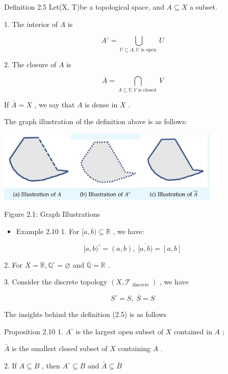 Definition 2.5 Let(X, T)be a topological space, and \(A \subseteq  X\) a subset.

1. The interior of \(A\) is

\[
{A}^{ \circ  } = \mathop{\bigcup }\limits_{{U \subseteq  A,U\text{ is open }}}U
\]

2. The closure of \(A\) is

\[
\bar{A} = \mathop{\bigcap }\limits_{{A \subseteq  V,V\text{ is closed }}}V
\]

If \(\bar{A} = X\) , we say that \(A\) is dense in \(X\) .

The graph illustration of the definition above is as follows:

\begin{center}
\includegraphics[max width=0.8\textwidth]{images/bo_d2bcsrref24c73avs720_25_282_922_1004_323_0.jpg}
\end{center}
\hspace*{3em} 

Figure 2.1: Graph Illustrations

\begin{itemize}
\item Example 2.10 1. For \(\lbrack a,b) \subseteq  \mathbb{R}\) , we have:
\end{itemize}

\[
\lbrack a,b{)}^{ \circ  } = \left( {a,b}\right) ,\;\overline{\lbrack a,b)} = \left\lbrack  {a,b}\right\rbrack
\]

2. For \(X = \mathbb{R},{\mathbb{Q}}^{ \circ  } = \varnothing\) and \(\overline{\mathbb{Q}} = \mathbb{R}\) .

3. Consider the discrete topology \(\left( {X,{\mathcal{T}}_{\text{ discrete }}}\right)\) , we have

\[
{S}^{ \circ  } = S,\;\bar{S} = S
\]

The insights behind the definition (2.5) is as follows

Proposition 2.10 1. \({A}^{ \circ  }\) is the largest open subset of \(X\) contained in \(A\) ;

\(\bar{A}\) is the smallest closed subset of \(X\) containing \(A\) .

2. If \(A \subseteq  B\) , then \({A}^{ \circ  } \subseteq  B\) and \(\bar{A} \subseteq  \bar{B}\)

